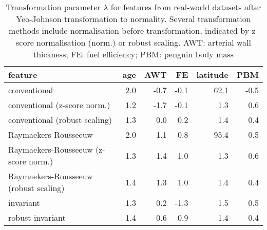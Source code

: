 \documentclass[
  a4paper,
]{article}
\begin{document}
\begin{table}
\begin{center}
\caption{Transformation parameter $\lambda$ for features from real-world datasets after Yeo-Johnson transformation to normality. 
Several transformation methods include normalisation before transformation, indicated by z-score normalisation (norm.) or robust scaling. 
AWT: arterial wall thickness; FE: fuel efficiency; PBM: penguin body mass}
\label{tab:normalisation-before-transformation-lambda-appendix}
\begin{tabular}{l | r r r r r}

\toprule
feature & age & AWT & FE & latitude & PBM \\

\midrule
conventional & 2.0 & -0.7 & -0.1 & 62.1 & -0.5 \\
conventional (z-score norm.) & 1.2 & -1.7 & -0.1 & 1.3 & 0.6 \\
conventional (robust scaling) & 1.3 & 0.0 & 0.2 & 1.4 & 0.4 \\
Raymaekers-Rousseeuw & 2.0 & 1.1 & 0.8 & 95.4 & -0.5 \\
Raymaekers-Rousseeuw (z-score norm.) & 1.3 & 1.4 & 1.0 & 1.3 & 0.6 \\
Raymaekers-Rousseeuw (robust scaling) & 1.4 & 1.3 & 1.0 & 1.4 & 0.4 \\
invariant & 1.3 & 0.2 & -1.3 & 1.5 & 0.5 \\
robust invariant & 1.4 & -0.6 & 0.9 & 1.4 & 0.4 \\
\bottomrule
\end{tabular}
\end{center}
\end{table}
\end{document}
